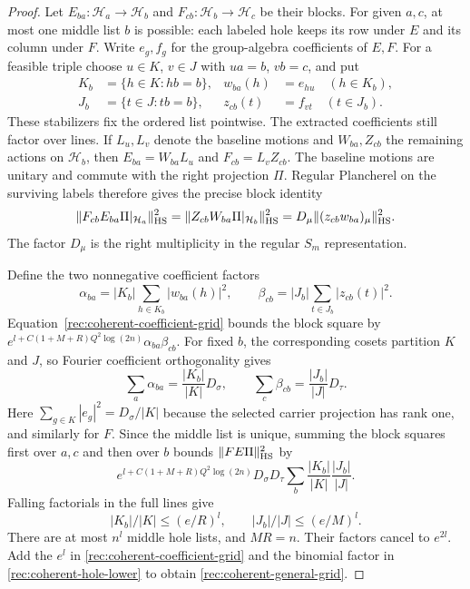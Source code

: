\begin{proof}
Let $E_{ba}:\mathcal H_a\to\mathcal H_b$ and
$F_{cb}:\mathcal H_b\to\mathcal H_c$ be their blocks.  For given
$a,c$, at most one middle list $b$ is possible: each labeled
hole keeps its row under $E$ and its column under $F$.
Write $e_g,f_g$ for the group-algebra coefficients of $E,F$.
For a feasible triple choose $u\in K$, $v\in J$ with $ua=b$,
$vb=c$, and put
\[
\begin{aligned}
 K_b&=\{h\in K:hb=b\},&
 w_{ba}(h)&=e_{hu}\quad(h\in K_b),\\
 J_b&=\{t\in J:tb=b\},&
 z_{cb}(t)&=f_{vt}\quad(t\in J_b).
\end{aligned}
\]
These stabilizers fix the ordered list pointwise.  The extracted
coefficients still factor over lines.  If $L_u,L_v$ denote the
baseline motions and $W_{ba},Z_{cb}$ the remaining actions on
$\mathcal H_b$, then
$E_{ba}=W_{ba}L_u$ and $F_{cb}=L_vZ_{cb}$.
The baseline motions are unitary and commute with the right
projection $\Pi$.  Regular Plancherel on the surviving labels
therefore gives the precise block identity
\begin{equation}\label{rec:coherent-fiber-identity}
 \|F_{cb}E_{ba}\Pi|_{\mathcal H_a}\|_{\mathrm{HS}}^2
 =\|Z_{cb}W_{ba}\Pi|_{\mathcal H_b}\|_{\mathrm{HS}}^2
 =D_\mu\|(z_{cb}w_{ba})_\mu\|_{\mathrm{HS}}^2.
\end{equation}
The factor $D_\mu$ is the right multiplicity in the regular
$S_m$ representation.

Define the two nonnegative coefficient factors
\[
 \alpha_{ba}=|K_b|\sum_{h\in K_b}|w_{ba}(h)|^2,
 \qquad
 \beta_{cb}=|J_b|\sum_{t\in J_b}|z_{cb}(t)|^2.
\]
Equation~\eqref{rec:coherent-coefficient-grid} bounds the block
square by $e^{l+C(1+M+R)Q^2\log(2n)}\alpha_{ba}\beta_{cb}$.
For fixed $b$, the corresponding cosets partition $K$ and $J$,
so Fourier coefficient orthogonality gives
\[
 \sum_a\alpha_{ba}=\frac{|K_b|}{|K|}D_\sigma,
 \qquad
 \sum_c\beta_{cb}=\frac{|J_b|}{|J|}D_\tau.
\]
Here $\sum_{g\in K}|e_g|^2=D_\sigma/|K|$ because the selected
carrier projection has rank one, and similarly for $F$.
Since the middle list is unique, summing the block squares first
over $a,c$ and then over $b$ bounds $\|FE\Pi\|_{\mathrm{HS}}^2$ by
\[
 e^{l+C(1+M+R)Q^2\log(2n)}D_\sigma D_\tau
       \sum_b\frac{|K_b|}{|K|}\frac{|J_b|}{|J|}.
\]
Falling factorials in the full lines give
\[
 |K_b|/|K|\le(e/R)^l,\qquad
 |J_b|/|J|\le(e/M)^l.
\]
There are at most $n^l$ middle hole lists, and $MR=n$.
Their factors cancel to $e^{2l}$.  Add the $e^l$ in
\eqref{rec:coherent-coefficient-grid} and the binomial factor in
\eqref{rec:coherent-hole-lower} to obtain
\eqref{rec:coherent-general-grid}.
\end{proof}

